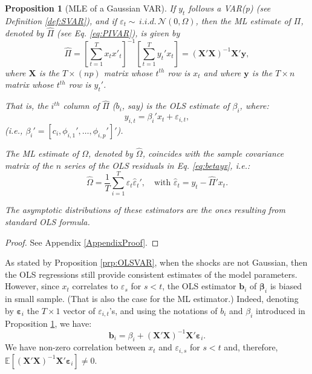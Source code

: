 \documentclass[
  12pt,
]{book}
\newtheorem{proposition}{Proposition}[chapter]
\theoremstyle{definition}
\theoremstyle{definition}
\theoremstyle{definition}
\theoremstyle{definition}
\theoremstyle{remark}
\begin{document}
\begin{proposition}[MLE of a Gaussian VAR]
\protect\hypertarget{prp:estimVARGaussian}{}\label{prp:estimVARGaussian}If \(y_t\) follows a VAR(p) (see Definition \ref{def:SVAR}), and if \(\varepsilon_t \sim \,i.i.d.\,\mathcal{N}(0,\Omega)\), then the ML estimate of \(\Pi\), denoted by \(\hat{\Pi}\) (see Eq. \eqref{eq:PIVAR}), is given by
\begin{equation}
\hat{\Pi}=\left[\sum_{t=1}^{T}x_{t}x'_{t}\right]^{-1}\left[\sum_{t=1}^{T}y_{t}'x_{t}\right]= (\mathbf{X}'\mathbf{X})^{-1}\mathbf{X}'\mathbf{y},\label{eq:Pi}
\end{equation}
where \(\mathbf{X}\) is the \(T \times (np)\) matrix whose \(t^{th}\) row is \(x_t\) and where \(\mathbf{y}\) is the \(T \times n\) matrix whose \(t^{th}\) row is \(y_{t}'\).

That is, the \(i^{th}\) column of \(\hat{\Pi}\) (\(b_i\), say) is the OLS estimate of \(\beta_i\), where:
\begin{equation}
y_{i,t} = \beta_i'x_t + \varepsilon_{i,t},\label{eq:betayx}
\end{equation}
(i.e., \(\beta_i' = [c_i,\phi_{i,1}',\dots,\phi_{i,p}']'\)).

The ML estimate of \(\Omega\), denoted by \(\hat{\Omega}\), coincides with the sample covariance matrix of the \(n\) series of the OLS residuals in Eq. \eqref{eq:betayx}, i.e.:
\begin{equation}
\hat{\Omega} = \frac{1}{T} \sum_{i=1}^T \hat{\varepsilon}_t\hat{\varepsilon}_t',\quad\mbox{with } \hat{\varepsilon}_t= y_t - \hat{\Pi}'x_t.
\end{equation}

The asymptotic distributions of these estimators are the ones resulting from standard OLS formula.
\end{proposition}

\begin{proof}
See Appendix \ref{AppendixProof}.
\end{proof}

As stated by Proposition \ref{prp:OLSVAR}, when the shocks are not Gaussian, then the OLS regressions still provide consistent estimates of the model parameters. However, since \(x_t\) correlates to \(\varepsilon_s\) for \(s<t\), the OLS estimator \(\mathbf{b}_i\) of \(\boldsymbol\beta_i\) is biased in small sample. (That is also the case for the ML estimator.) Indeed, denoting by \(\boldsymbol\varepsilon_i\) the \(T \times 1\) vector of \(\varepsilon_{i,t}\)'s, and using the notations of \(b_i\) and \(\beta_i\) introduced in Proposition \ref{prp:estimVARGaussian}, we have:
\begin{equation}
\mathbf{b}_i = \beta_i + (\mathbf{X}'\mathbf{X})^{-1}\mathbf{X}'\boldsymbol\varepsilon_i.\label{eq:olsar1}
\end{equation}
We have non-zero correlation between \(x_t\) and \(\varepsilon_{i,s}\) for \(s<t\) and, therefore, \(\mathbb{E}[(\mathbf{X}'\mathbf{X})^{-1}\mathbf{X}'\boldsymbol\varepsilon_i] \ne 0\).
\end{document}
